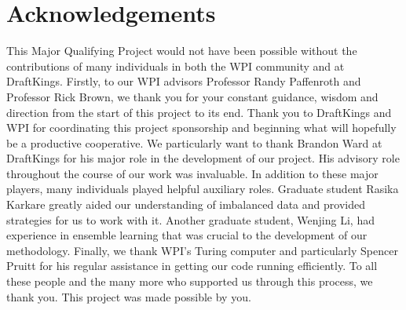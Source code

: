 \chapter*{Acknowledgements}


This Major Qualifying Project would not have been possible without the contributions of many individuals in both the WPI community and at DraftKings. Firstly, to our WPI advisors Professor Randy Paffenroth and Professor Rick Brown, we thank you for your constant guidance, wisdom and direction from the start of this project to its end. Thank you to DraftKings and WPI for coordinating this project sponsorship and beginning what will hopefully be a productive cooperative. We particularly want to thank Brandon Ward at DraftKings for his major role in the development of our project. His advisory role throughout the course of our work was invaluable. In addition to these major players, many individuals played helpful auxiliary roles. Graduate student Rasika Karkare greatly aided our understanding of imbalanced data and provided strategies for us to work with it. Another graduate student, Wenjing Li, had experience in ensemble learning that was crucial to the development of our methodology. Finally, we thank WPI's Turing computer and particularly Spencer Pruitt for his regular assistance in getting our code running efficiently. To all these people and the many more who supported us through this process, we thank you. This project was made possible by you. \newline

